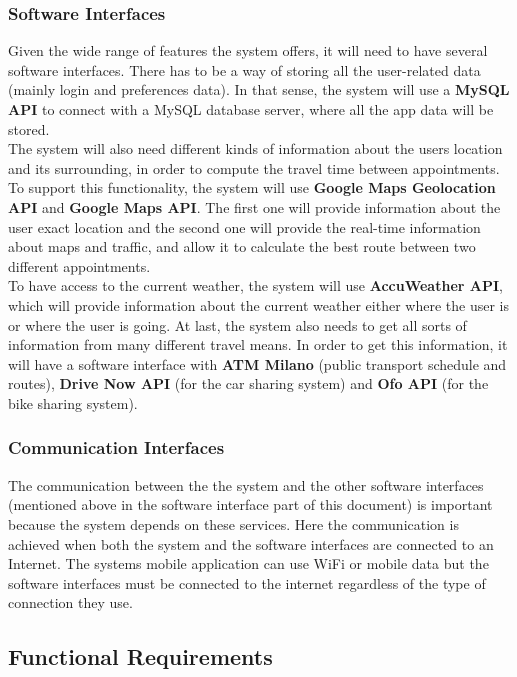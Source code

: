 \documentclass[12pt]{article}
\begin{document}
\subsubsection{Software Interfaces}
Given the wide range of features the system offers, it will need to have several software interfaces. There has to be a way of storing all the user-related data (mainly login and preferences data). In that sense, the system will use a \textbf{MySQL API} to connect with a MySQL database server, where all the app data will be stored.\\
The system will also need different kinds of information about the users location and its surrounding, in order to compute the travel time between appointments. To support this functionality, the system will use \textbf{Google Maps Geolocation API} and \textbf{Google Maps API}. The first one will provide information about the user exact location and the second one will provide the real-time information about maps and traffic, and allow it to calculate the best route between two different appointments.\\
To have access to the current weather, the system will use \textbf{AccuWeather API}, which will provide information about the current weather either where the user is or where the user is going.
At last, the system also needs to get all sorts of information from many different travel means. In order to get this information, it will have a software interface with \textbf{ATM Milano} (public transport schedule and routes), \textbf{Drive Now API} (for the car sharing system) and \textbf{Ofo API} (for the bike sharing system).



\subsubsection{Communication Interfaces}
The communication between the the system and the other software interfaces (mentioned above in the software interface part of this document) is important because the system depends on these services. Here the communication is achieved when both the system and the software interfaces are connected to an Internet. The systems mobile application can use WiFi or mobile data but the software interfaces must be connected to the internet regardless of the type of connection they use.

\subsection{Functional Requirements}
\end{document}
